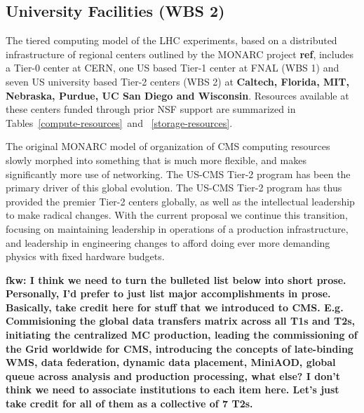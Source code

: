 \documentclass[11pt,a4paper]{article}
\begin{document}
\subsection{University Facilities (WBS 2)}

The tiered computing model of the LHC experiments, based on a 
distributed infrastructure of regional centers outlined by
the MONARC project {\bf ref}, includes a Tier-0 center at CERN,
one US based Tier-1 center at FNAL (WBS 1) and seven US 
university based Tier-2 centers (WBS 2) at 
{\bf Caltech, Florida, MIT, Nebraska, Purdue, UC San Diego and Wisconsin}.
Resources available at these centers funded through prior NSF
support are summarized in Tables~\ref{compute-resources}~and~
\ref{storage-resources}.

The original MONARC model of organization of CMS computing resources
slowly morphed into something that is much more flexible, and makes significantly more use 
of networking.  The US-CMS Tier-2 program has been the primary driver of this global evolution.
The US-CMS Tier-2 program has thus provided the premier Tier-2 centers globally,
as well as the intellectual leadership to make radical changes. With the current proposal
we continue this transition, focusing on maintaining leadership in operations of a
production infrastructure, and leadership in engineering changes to afford
doing ever more demanding physics with fixed hardware budgets.

{\bf fkw: I think we need to turn the bulleted list below into short prose. Personally, I'd prefer 
to just list major accomplishments in prose. Basically, take credit here for stuff that we introduced to CMS.
E.g. Commisioning the global data transfers matrix across all T1s and T2s, initiating the centralized MC production, 
leading the commissioning of the Grid worldwide for CMS, introducing the concepts of late-binding WMS,
data federation, dynamic data placement, MiniAOD, global queue across analysis and production processing, what else?
I don't think we need to associate institutions to each item here. Let's just take credit for all of them as a collective of 7 T2s.}
\end{document}
